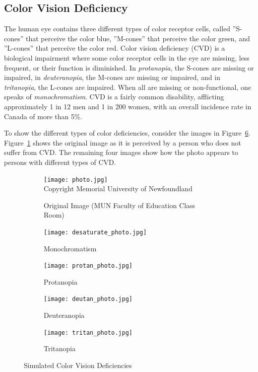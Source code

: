 \subsection*{Color Vision Deficiency}

The human eye contains three different types of color receptor cells, called ''S-cones'' that perceive the color blue, ''M-cones'' that perceive the color green, and ''L-cones'' that perceive the color red. Color vision deficiency (CVD) is a biological impairment where some color receptor cells in the eye are missing, less frequent, or their function is diminished. In \emph{protanopia}, the S-cones are missing or impaired, in \emph{deuteranopia}, the M-cones are missing or impaired, and in \emph{tritanopia}, the L-cones are impaired. When all are missing or non-functional, one speaks of \emph{monochromatism}. CVD is a fairly common disability, afflicting approximately 1 in 12 men and 1 in 200 women, with an overall incidence rate in Canada of more than 5\%.

To show the different types of color deficiencies, consider the images in Figure~\ref{fig:cvd}. Figure~\ref{fig:cvd1} shows the original image as it is perceived by a person who does not suffer from CVD. The remaining four images show how the photo appears to persons with different types of CVD.

\begin{figure}
\centering
\begin{subfigure}{.75\textwidth}
\centering
\texttt{[image: photo.jpg]} \\

\scriptsize Copyright Memorial University of Newfoundland 
\caption{Original Image (MUN Faculty of Education Class Room)} 
\label{fig:cvd1}
\end{subfigure}
\hfill
\begin{subfigure}{.49\textwidth}
\centering
\texttt{[image: desaturate\_photo.jpg]}
\caption{Monochromatism} 
\label{fig:cvd2}
\end{subfigure}
\hfill
\begin{subfigure}{.49\textwidth}
\centering
\texttt{[image: protan\_photo.jpg]}
\caption{Protanopia} 
\label{fig:cvd3}
\end{subfigure}
\hfill
\begin{subfigure}{.49\textwidth}
\centering
\texttt{[image: deutan\_photo.jpg]}
\caption{Deuteranopia} 
\label{fig:cvd4}
\end{subfigure}
\hfill
\begin{subfigure}{.49\textwidth}
\centering
\texttt{[image: tritan\_photo.jpg]}
\caption{Tritanopia} 
\label{fig:cvd5}
\end{subfigure}
\hfill
\caption{Simulated Color Vision Deficiencies}
\label{fig:cvd}
\end{figure}

